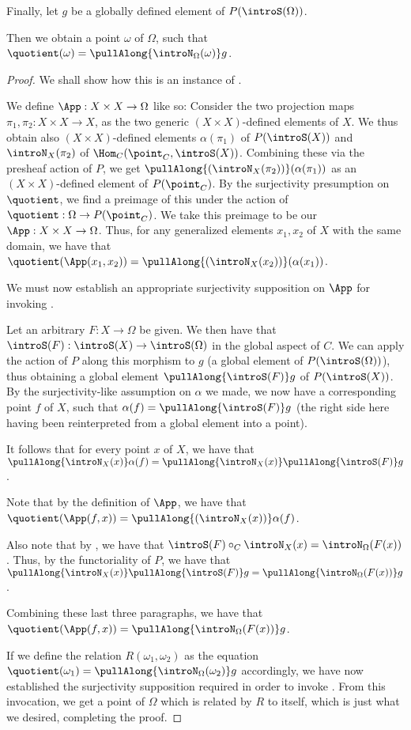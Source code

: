 Finally, let $g$ be a globally defined element of $P(\introS(\Omega))$.

Then we obtain a point $\omega$ of $\Omega$, such that $\quotient(\omega) = \pullAlong{\introN_{\Omega}(\omega)} g$.
\begin{proof}
We shall show how this is an instance of .

We define $\App : X \times X \to \Omega$ like so: Consider the two projection maps $\pi_1, \pi_2 : X \times X \to X$, as the two generic $(X \times X)$-defined elements of $X$. We thus obtain also $(X \times X)$-defined elements $\alpha(\pi_1)$ of $P(\introS(X))$ and $\introN_{X}(\pi_2)$ of $\Hom_C(\point_C, \introS(X))$. Combining these via the presheaf action of $P$, we get $\pullAlong{( \introN_{X}(\pi_2) )} ( \alpha(\pi_1) )$ as an $(X \times X)$-defined element of $P(\point_C)$. By the surjectivity presumption on $\quotient$, we find a preimage of this under the action of $\quotient : \Omega \to P(\point_C)$. We take this preimage to be our $\App : X \times X \to \Omega$. Thus, for any generalized elements $x_1, x_2$ of $X$ with the same domain, we have that $\quotient(\App(x_1, x_2)) = \pullAlong{( \introN_{X}(x_2) )} ( \alpha(x_1) )$.

We must now establish an appropriate surjectivity supposition on $\App$ for invoking . 

Let an arbitrary $F : X \to \Omega$ be given. We then have that $\introS(F) : \introS(X) \to \introS(\Omega)$ in the global aspect of $C$. We can apply the action of $P$ along this morphism to $g$ (a global element of $P(\introS(\Omega))$), thus obtaining a global element $\pullAlong{\introS(F)} g$ of $P(\introS(X))$. By the surjectivity-like assumption on $\alpha$ we made, we now have a corresponding point $f$ of $X$, such that $\alpha(f) = \pullAlong{\introS(F)} g$ (the right side here having been reinterpreted from a global element into a point).

It follows that for every point $x$ of $X$, we have that $\pullAlong{\introN_{X}(x)} \alpha(f) = \pullAlong{\introN_{X}(x)} \pullAlong{\introS(F)} g$.

Note that by the definition of $\App$, we have that $\quotient(\App(f, x)) = \pullAlong{( \introN_{X}(x) )} \alpha(f)$.

Also note that by , we have that $\introS(F) \circ_C \introN_{X}(x) = \introN_{\Omega}(F(x))$. Thus, by the functoriality of $P$, we have that $\pullAlong{\introN_{X}(x)} \pullAlong{\introS(F)} g =  \pullAlong{\introN_{\Omega}(F(x))} g$.

Combining these last three paragraphs, we have that $\quotient(\App(f, x)) =  \pullAlong{\introN_{\Omega}(F(x))} g$.

If we define the relation $R(\omega_1, \omega_2)$ as the equation $\quotient(\omega_1) = \pullAlong{\introN_{\Omega}(\omega_2)} g$ accordingly, we have now established the surjectivity supposition required in order to invoke . From this invocation, we get a point of $\Omega$ which is related by $R$ to itself, which is just what we desired, completing the proof.
\end{proof}
